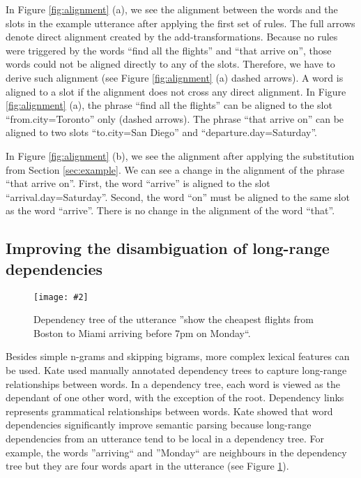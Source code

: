 \documentclass{article}
\newcommand{\citep}[1]{\cite{#1}}
\newcommand{\fgrparam}[4]{
  \begin{figure}[htbp]
    \begin{center}
      \leavevmode
      \texttt{[image: \#2]}
    \end{center}
    \vspace{-0.5cm}
    \caption{#4}
    \label{#3}
  \end{figure}
}
\begin{document}

In Figure \ref{fig:alignment} (a), we see the alignment between the words and the slots in the example utterance after applying the first set of rules. The full arrows denote direct alignment created by the add-transformations. Because no rules were triggered by the words ``find all the flights'' and ``that arrive on'', those words could not be aligned directly to any of the slots. Therefore, we have to derive such alignment (see Figure \ref{fig:alignment} (a) dashed arrows). A word is aligned to a slot if the alignment does not cross any direct alignment.
In Figure \ref{fig:alignment} (a), the phrase ``find all the flights'' can be aligned to the slot ``from.city=Toronto'' only (dashed arrows). The phrase ``that arrive on'' can be aligned to two slots ``to.city=San Diego'' and ``departure.day=Saturday''. 

In Figure \ref{fig:alignment} (b), we see the alignment after applying the substitution from Section \ref{sec:example}. We can see a change in the alignment of the phrase ``that arrive on''. First, the word ``arrive'' is aligned to the slot ``arrival.day=Saturday''. Second, the word ``on'' must be aligned to the same slot as the word ``arrive''. There is no change in the alignment of the word ``that''.



\subsection{Improving the disambiguation of long-range dependencies}
\label{sec:dep:trees}

\fgrparam{width=6cm}{./fig/dep-tree.pdf}{fig:dep:tree}{Dependency tree of the utterance ''show the cheapest flights from Boston to Miami arriving before 7pm on Monday``.}

Besides simple n-grams and skipping bigrams, more complex lexical features can be used. Kate \citep{kate08} used manually annotated dependency trees to capture long-range relationships between words. In a dependency tree, each word is viewed as the dependant of one other word, with the exception of the root. Dependency links represents grammatical relationships between words.
Kate showed that word dependencies significantly improve semantic parsing because long-range dependencies from an utterance tend to be local in a dependency tree. For example, the words ''arriving`` and ''Monday`` are neighbours in the dependency tree but they are four words apart in the utterance (see Figure \ref{fig:dep:tree}).
\end{document}
